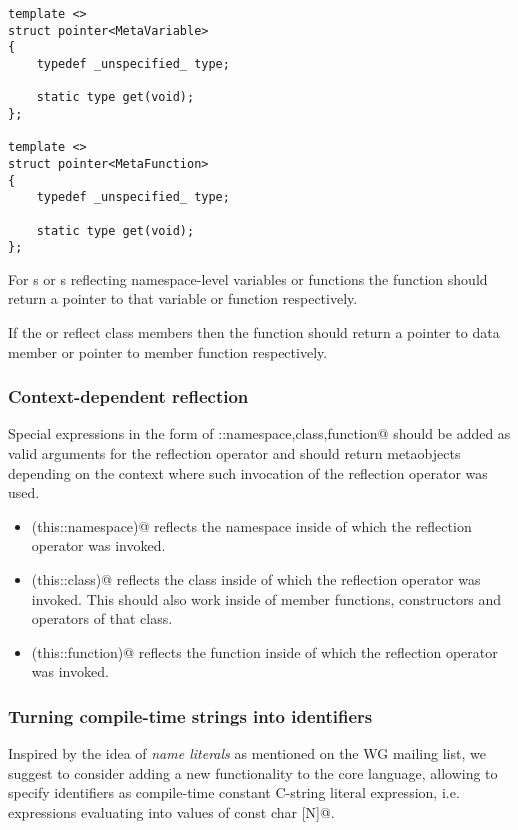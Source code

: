 \begin{verbatim}
template <>
struct pointer<MetaVariable>
{
	typedef _unspecified_ type;

	static type get(void);
};

template <>
struct pointer<MetaFunction>
{
	typedef _unspecified_ type;

	static type get(void);
};
\end{verbatim}

For s or s reflecting namespace-level variables or functions
the \verb@get@ function should return a pointer to that variable or function respectively.

If the  or  reflect class members then the \verb@get@ function
should return a pointer to data member or pointer to member function respectively.

\subsubsection{Context-dependent reflection}

Special expressions in the form of \verb@this::{namespace,class,function}@ should be added
as valid arguments for the reflection operator and should return metaobjects depending
on the context where such invocation of the reflection operator was used.

\begin{itemize}
\item{\verb@mirrored(this::namespace)@} reflects the namespace inside of which the reflection
operator was invoked.
\item{\verb@mirrored(this::class)@} reflects the class inside of which the reflection
operator was invoked. This should also work inside of member functions, constructors and operators
of that class.
\item{\verb@mirrored(this::function)@} reflects the function inside of which the reflection
operator was invoked.
\end{itemize}

\subsubsection{Turning compile-time strings into identifiers}

Inspired by the idea of {\em name literals} as mentioned on the WG mailing list,
we suggest to consider adding a new functionality to the core language, allowing to specify
identifiers as compile-time constant C-string literal expression, i.e. expressions
evaluating into values of \verb@constexpr const char [N]@.

